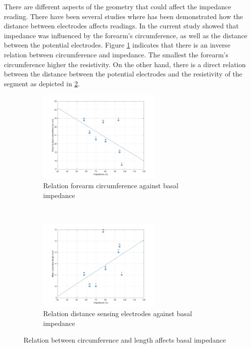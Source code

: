 There are different aspects of the geometry that could affect the impedance reading. There have been several studies where has been demonstrated how the distance between electrodes affects readings. In the current study showed that impedance was influenced by the forearm's circumference, as well as the distance between the potential electrodes. Figure \ref{fig:C_vs_Z} indicates that there is an inverse relation between circumference and impedance. The smallest the forearm's circumference higher the resistivity. On the other hand, there is a direct relation between the distance between the potential electrodes and the resistivity of the segment as depicted in \ref{fig:l_vs_Z}.

 \begin{figure}[t!]
 	\centering
 	\begin{subfigure}[t]{0.5\textwidth}
 		\centering
 		\includegraphics[height=4.5cm]{figure2a}
 		\caption{Relation forearm circumference against basal impedance}
 		\label{fig:C_vs_Z}
 	\end{subfigure}%
 	~ 
 	\begin{subfigure}[t]{0.5\textwidth}
 		\centering
 		\includegraphics[height=4.5cm]{figure2b}
 		\caption{Relation distance sensing electrodes against basal impedance}
 		\label{fig:l_vs_Z}
 	\end{subfigure}
 	\caption{Relation between circumference and length affects basal impedance}
 	\label{fig:relation_geometry_vs_impedance}
 \end{figure}


